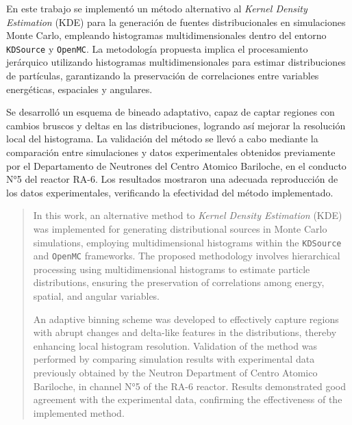 \begin{resumen}%
En este trabajo se implementó un método alternativo al \textit{Kernel Density Estimation} (KDE) para la generación de fuentes distribucionales en simulaciones Monte Carlo, empleando histogramas multidimensionales dentro del entorno \texttt{KDSource} y \texttt{OpenMC}. La metodología propuesta implica el procesamiento jerárquico utilizando histogramas multidimensionales para estimar distribuciones de partículas, garantizando la preservación de correlaciones entre variables energéticas, espaciales y angulares.

Se desarrolló un esquema de bineado adaptativo, capaz de captar regiones con cambios bruscos y deltas en las distribuciones, logrando así mejorar la resolución local del histograma. La validación del método se llevó a cabo mediante la comparación entre simulaciones y datos experimentales obtenidos previamente por el Departamento de Neutrones del Centro Atomico Bariloche, en el conducto N°5 del reactor RA-6. Los resultados mostraron una adecuada reproducción de los datos experimentales, verificando la efectividad del método implementado.

\end{resumen}

\begin{abstract}%
In this work, an alternative method to \textit{Kernel Density Estimation} (KDE) was implemented for generating distributional sources in Monte Carlo simulations, employing multidimensional histograms within the \texttt{KDSource} and \texttt{OpenMC} frameworks. The proposed methodology involves hierarchical processing using multidimensional histograms to estimate particle distributions, ensuring the preservation of correlations among energy, spatial, and angular variables.

An adaptive binning scheme was developed to effectively capture regions with abrupt changes and delta-like features in the distributions, thereby enhancing local histogram resolution. Validation of the method was performed by comparing simulation results with experimental data previously obtained by the Neutron Department of Centro Atomico Bariloche, in channel N°5 of the RA-6 reactor. Results demonstrated good agreement with the experimental data, confirming the effectiveness of the implemented method.

\end{abstract}



